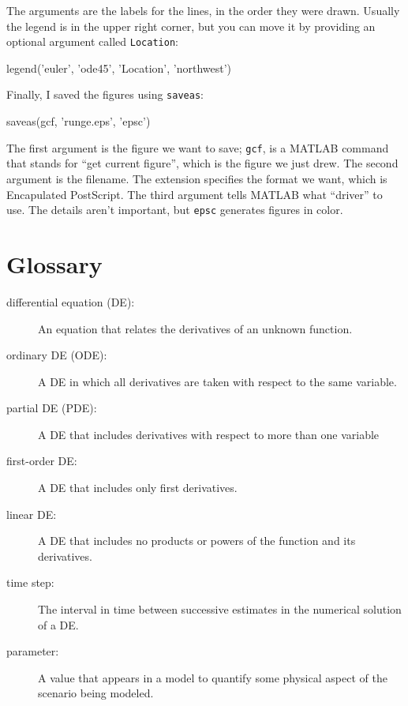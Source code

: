 \documentclass[main.tex]{subfiles}
\begin{document}
The arguments are the labels for the lines, in the order they were drawn.  Usually the legend is in the upper right corner, but you can move it by providing an optional argument called {\tt Location}:

\begin{code}
legend('euler', 'ode45', 'Location', 'northwest')
\end{code}

Finally, I saved the figures using {\tt saveas}:

\begin{code}
saveas(gcf, 'runge.eps', 'epsc')
\end{code}

The first argument is the figure we want to save; {\tt gcf}, is a MATLAB command that stands for ``get current figure'', which is the figure we just drew.  The second argument is the filename.  The extension specifies the format we want, which is Encapulated PostScript.  The third argument tells MATLAB what ``driver'' to use.  The details aren't important, but {\tt epsc} generates figures in color.




\section{Glossary}

\begin{description}

\item[differential equation (DE):] An equation that relates the
derivatives of an unknown function.

\item[ordinary DE (ODE):] A DE in which all derivatives are taken with
respect to the same variable.

\item[partial DE (PDE):] A DE that includes derivatives with respect to
more than one variable

\item[first-order DE:] A DE that includes only first derivatives.

\item[linear DE:] A DE that includes no products or powers of the
function and its derivatives.

\item[time step:] The interval in time between successive estimates
in the numerical solution of a DE.

\item[parameter:] A value that appears in a model to quantify some
physical aspect of the scenario being modeled.

\end{description}
\end{document}
